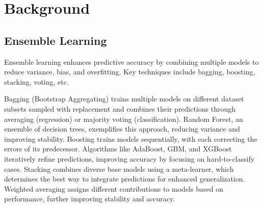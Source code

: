 \documentclass{article}
\begin{document}
\section{Background}



\subsection{Ensemble Learning}
Ensemble learning enhances predictive accuracy by combining multiple models to reduce variance, bias, and overfitting. Key techniques include bagging, boosting, stacking, voting, etc.

Bagging \cite{bagging} (Bootstrap Aggregating) trains multiple models on different dataset subsets sampled with replacement and combines their predictions through averaging (regression) or majority voting (classification). Random Forest, an ensemble of decision trees, exemplifies this approach, reducing variance and improving stability.
Boosting \cite{boosting} trains models sequentially, with each correcting the errors of its predecessor. Algorithms like AdaBoost, GBM, and XGBoost iteratively refine predictions, improving accuracy by focusing on hard-to-classify cases.
Stacking \cite{stacking} combines diverse base models using a meta-learner, which determines the best way to integrate predictions for enhanced generalization. Weighted averaging assigns different contributions to models based on performance, further improving stability and accuracy.
\end{document}
